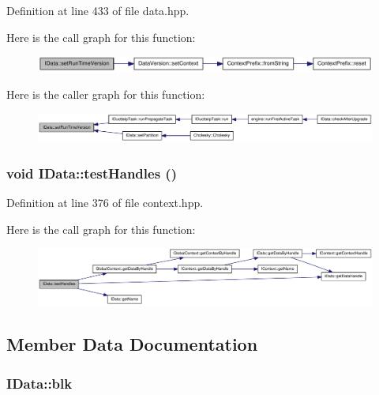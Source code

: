 Definition at line 433 of file data.hpp.

Here is the call graph for this function:\nopagebreak
\begin{figure}[H]
\begin{center}
\leavevmode
\includegraphics[width=322pt]{class_i_data_af915b3633d8d539f6aa16aa0657cfc18_cgraph}
\end{center}
\end{figure}


Here is the caller graph for this function:\nopagebreak
\begin{figure}[H]
\begin{center}
\leavevmode
\includegraphics[width=420pt]{class_i_data_af915b3633d8d539f6aa16aa0657cfc18_icgraph}
\end{center}
\end{figure}
\hypertarget{class_i_data_a75c651eb04ef64c699e24dfc0db2bfd4}{
\subsubsection[{testHandles}]{\setlength{\rightskip}{0pt plus 5cm}void IData::testHandles ()}}
\label{class_i_data_a75c651eb04ef64c699e24dfc0db2bfd4}


Definition at line 376 of file context.hpp.

Here is the call graph for this function:\nopagebreak
\begin{figure}[H]
\begin{center}
\leavevmode
\includegraphics[width=420pt]{class_i_data_a75c651eb04ef64c699e24dfc0db2bfd4_cgraph}
\end{center}
\end{figure}


\subsection{Member Data Documentation}
\hypertarget{class_i_data_a79e707470ffc0e3cb3b7a64a2ed3c6d3}{
\subsubsection[{blk}]{ {\bf IData::blk}}}
\label{class_i_data_a79e707470ffc0e3cb3b7a64a2ed3c6d3}


